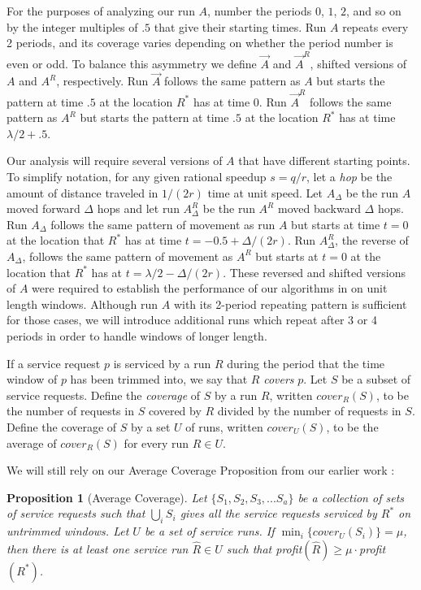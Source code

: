 \documentclass[11pt]{article}
\newtheorem{proposition}{Proposition}[section]
\begin{document}
For the purposes of analyzing our run $A$, number the periods $0$, $1$, $2$, and so on by the integer multiples of $.5$ that give their starting times.  Run $A$ repeats every 2 periods, and its coverage varies depending on whether the period number is even or odd.  To balance this asymmetry we define $\vec{A}$ and $\vec{A}^R$, shifted versions of $A$ and $A^R$, respectively.  Run $\vec{A}$ follows the same pattern as $A$ but starts the pattern at time $.5$ at the location $R^*$ has at time 0.  Run $\vec{A}^R$ follows the same pattern as $A^R$ but starts the pattern at time $.5$ at the location $R^*$ has at time $\lambda/2 + .5$.

Our analysis will require several versions of $A$ that have different starting points.  To simplify notation, for any given rational speedup $s = q/r$, let a {\em hop} be the amount of distance traveled in $1/(2r)$ time at unit speed.  Let $A_\Delta$ be the run $A$ moved forward $\Delta$ hops and let run $A_\Delta^R$ be the run $A^R$ moved backward $\Delta$ hops. Run $A_\Delta$ follows the same pattern of movement as run $A$ but starts at time $t = 0$ at the location that $R^*$ has at  time $t = -0.5 + \Delta/(2r)$.  Run $A_\Delta^R$, the reverse of $A_\Delta$, follows the same pattern of movement as $A^R$ but starts at $t = 0$ at the location that $R^*$ has at $t = \lambda/2 - \Delta/(2r)$.  These reversed and shifted versions of $A$ were required to establish the performance of our algorithms in \cite{Frederickson5} on unit length windows.  Although run $A$ with its 2-period repeating pattern is sufficient for those cases, we will introduce additional runs which repeat after 3 or 4 periods in order to handle windows of longer length.

If a service request $p$ is serviced by a run $R$ during the period that the time window of $p$ has been trimmed into, we say that $R$ {\em covers} $p$.
Let $S$ be a subset of service requests.  Define the {\em coverage} of $S$ by a run $R$, written $cover_R(S)$, to be the number of requests in $S$ covered by $R$ divided by the number of requests in $S$.  Define the coverage of $S$ by a set $U$ of runs, written $cover_U(S)$, to be the average of $cover_R(S)$ for every run $R \in U$.

We will still rely on our Average Coverage Proposition from our earlier work \cite{Frederickson5}:

\begin{proposition}[Average Coverage] \label{proposition:averaging}  Let $\{S_1, S_2, S_3, ... S_a\}$ be a collection of sets of service requests such that $\bigcup_i S_i$ gives all the service requests serviced by $R^*$ on untrimmed windows.  Let $U$ be a set of service runs.  If $\min_i\{cover_U(S_i)\} = \mu$, then there is at least one service run $\hat{R} \in U$ such that profit$(\hat{R}) \geq \mu \cdot$profit$( R^* )$.
\end{proposition}
\end{document}
